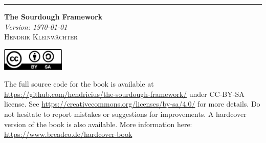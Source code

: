 \rule{1pt}{\textheight} %
\hspace{0.05\textwidth}
\parbox[b]{0.75\textwidth}{%
{\Huge\bfseries The Sourdough Framework}\\[2\baselineskip] %
{\large\textit{Version: \today}}\\[4\baselineskip]
{\Large\textsc{Hendrik Kleinwächter}} %

\vspace{0.5\textheight}


{\noindent
\begin{flushleft}
    \includegraphics[width=3cm]{cover/CC-BY-SA}\par
The full source code for the book is available at
\url{https://github.com/hendricius/the-sourdough-framework/} under CC-BY-SA
license.
See \url{https://creativecommons.org/licenses/by-sa/4.0/} for more details.
Do not hesitate to report mistakes or sug\-gestions for
improvements. A hardcover version of the book is also available. More
information here: \url{https://www.breadco.de/hardcover-book}
\end{flushleft}
}
}
